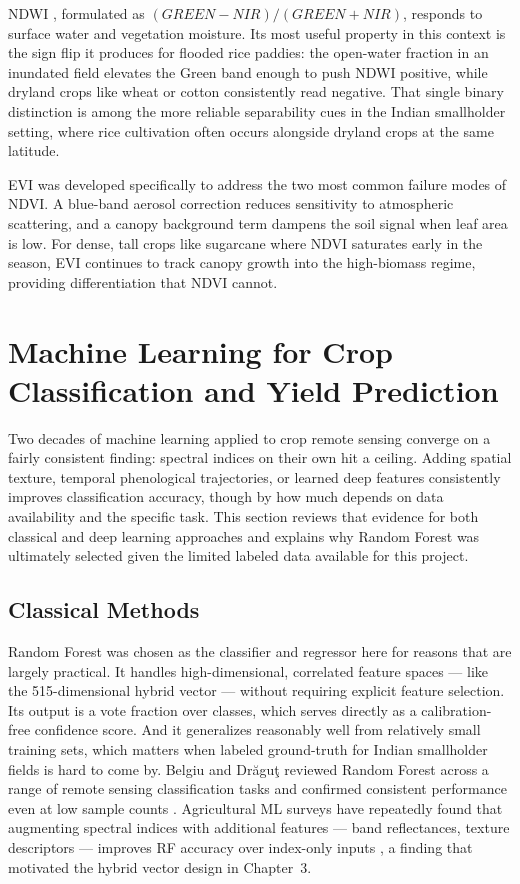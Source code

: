 \documentclass[12pt,a4paper,oneside]{report}
\begin{document}
NDWI \cite{mcfeeters1996ndwi}, formulated as $(GREEN - NIR)/(GREEN + NIR)$, responds
to surface water and vegetation moisture. Its most useful property in this context is
the sign flip it produces for flooded rice paddies: the open-water fraction in an
inundated field elevates the Green band enough to push NDWI positive, while dryland
crops like wheat or cotton consistently read negative. That single binary distinction
is among the more reliable separability cues in the Indian smallholder setting, where
rice cultivation often occurs alongside dryland crops at the same latitude.

EVI \cite{huete2002evi} was developed specifically to address the two most common
failure modes of NDVI. A blue-band aerosol correction reduces sensitivity to
atmospheric scattering, and a canopy background term dampens the soil signal when
leaf area is low. For dense, tall crops like sugarcane where NDVI saturates early
in the season, EVI continues to track canopy growth into the high-biomass regime,
providing differentiation that NDVI cannot.

\section{Machine Learning for Crop Classification and Yield Prediction}

Two decades of machine learning applied to crop remote sensing converge on a fairly consistent finding: spectral indices on their own hit a ceiling. Adding spatial texture, temporal phenological trajectories, or learned deep features consistently improves classification accuracy, though by how much depends on data availability and the specific task. This section reviews that evidence for both classical and deep learning approaches and explains why Random Forest was ultimately selected given the limited labeled data available for this project.

\subsection{Classical Methods}

Random Forest \cite{breiman2001random} was chosen as the classifier and regressor
here for reasons that are largely practical. It handles high-dimensional, correlated
feature spaces — like the 515-dimensional hybrid vector — without requiring explicit
feature selection. Its output is a vote fraction over classes, which serves directly
as a calibration-free confidence score. And it generalizes reasonably well from
relatively small training sets, which matters when labeled ground-truth for Indian
smallholder fields is hard to come by. Belgiu and Dr\u{a}gu\c{t} reviewed Random
Forest across a range of remote sensing classification tasks and confirmed consistent
performance even at low sample counts \cite{belgiu2016random}. Agricultural ML
surveys have repeatedly found that augmenting spectral indices with additional
features — band reflectances, texture descriptors — improves RF accuracy over
index-only inputs \cite{liakos2018machine, kamilaris2018deep}, a finding that
motivated the hybrid vector design in Chapter~3.
\end{document}
